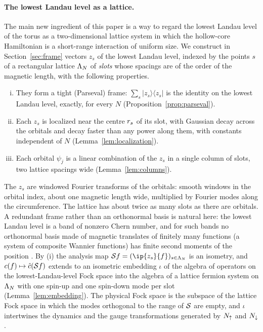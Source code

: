 \paragraph{The lowest Landau level as a lattice.}
The main new ingredient of this paper is a way to regard the lowest Landau level of the torus as a
two-dimensional lattice system in which the hollow-core Hamiltonian is a short-range interaction of uniform
size. We construct in Section~\ref{sec:frame} vectors $z_s$ of the lowest Landau level, indexed by the points
$s$ of a rectangular lattice $\Lambda_N$ of \emph{slots} whose spacings are of the order of the magnetic length,
with the following properties.
\begin{enumerate}[(i)]
\item They form a tight (Parseval) frame: $\sum_s\lvert z_s\rangle\langle z_s\rvert$ is the identity on the
lowest Landau level, exactly, for every $N$ (Proposition~\ref{prop:parseval}).
\item Each $z_s$ is localized near the centre $r_{s}$ of its slot, with Gaussian decay across the
orbitals and decay faster than any power along them, with constants independent of $N$
(Lemma~\ref{lem:localization}).
\item Each orbital $\psi_j$ is a linear combination of the $z_s$ in a single column of slots, two lattice
spacings wide (Lemma~\ref{lem:columns}).
\end{enumerate}
The $z_s$ are windowed Fourier transforms of the orbitals: smooth windows in the orbital index, about one
magnetic length wide, multiplied by Fourier modes along the circumference. The lattice has about twice as
many slots as there are orbitals. A redundant frame rather than an orthonormal basis is natural here: the
lowest Landau level is a band of nonzero Chern number, and for such bands no orthonormal basis made of magnetic
translates of finitely many functions (a system of composite Wannier functions) has finite second moments of the
position \cite{MPPT18}. By (i) the analysis map
$\Sa f=(\ip{z_s}{f})_{s\in\Slots}$ is an isometry, and $c(f)\mapsto\hat{c}(\mathcal{S} f)$ extends to an isometric
embedding $\iota$ of the algebra of operators on the lowest-Landau-level Fock space into the algebra of a
lattice fermion system on $\Lambda_N$ with one spin-up and one spin-down mode per slot
(Lemma~\ref{lem:embedding}). The physical Fock space is the subspace of the lattice Fock space in which the
modes orthogonal to the range of $\mathcal{S}$ are empty, and $\iota$ intertwines the dynamics and the gauge
transformations generated by $N_{\uparrow}$ and $N_{\downarrow}$.

